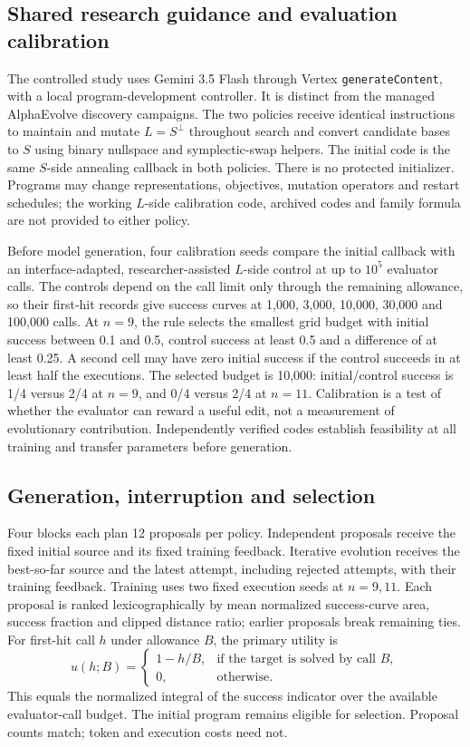 \subsection{Shared research guidance and evaluation calibration}
\label{app:hitl-protocol}
The controlled study uses Gemini 3.5 Flash through Vertex
\texttt{generateContent}, with a local program-development controller.
It is distinct from the managed AlphaEvolve discovery campaigns.
The two policies receive identical instructions to maintain and mutate
$L=S^\perp$ throughout search and convert candidate bases to $S$ using
binary nullspace and symplectic-swap helpers. The initial code is the
same $S$-side annealing callback in both policies. There is no protected
initializer. Programs may change representations, objectives, mutation
operators and restart schedules; the working $L$-side calibration code,
archived codes and family formula are not provided to either policy.

Before model generation, four calibration seeds compare the initial
callback with an interface-adapted, researcher-assisted $L$-side control
at up to $10^5$ evaluator calls. The controls depend on the call limit
only through the remaining allowance, so their first-hit records give
success curves at 1,000, 3,000, 10,000, 30,000 and 100,000 calls.
At $n=9$, the rule selects the smallest grid budget with initial
success between 0.1 and 0.5, control success at least 0.5 and a difference
of at least 0.25. A second cell may have zero initial success if the
control succeeds in at least half the executions. The selected budget
is 10,000: initial/control success is 1/4 versus 2/4 at $n=9$, and
0/4 versus 2/4 at $n=11$. Calibration is a test of whether the evaluator
can reward a useful edit, not a measurement of evolutionary contribution.
Independently verified codes establish feasibility at all training and transfer
parameters before generation.

\subsection{Generation, interruption and selection}\label{app:hitl-selection}
Four blocks each plan 12 proposals per policy. Independent proposals
receive the fixed initial source and its fixed training feedback.
Iterative evolution receives the best-so-far source and the latest
attempt, including rejected attempts, with their training feedback.
Training uses two fixed execution seeds at $n=9,11$. Each proposal is
ranked lexicographically by mean normalized success-curve area, success
fraction and clipped distance ratio; earlier proposals break remaining
ties. For first-hit call $h$ under allowance $B$, the primary utility is
\[
 u(h;B)=\begin{cases}1-h/B,&\text{if the target is solved by call }B,\\
 0,&\text{otherwise.}\end{cases}
\]
This equals the normalized integral of the success indicator over the
available evaluator-call budget. The initial program remains eligible
for selection. Proposal counts match; token and execution costs need not.

